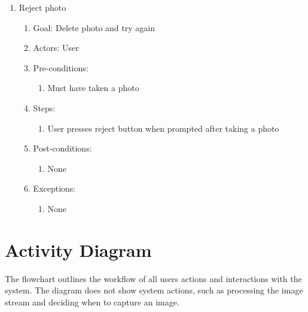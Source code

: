 \documentclass{scu-thesis}
\begin{document}
\begin{enumerate}
    \item Reject photo
    \begin{enumerate}
        \item Goal: Delete photo and try again
        \item Actors: User
        \item Pre-conditions: 
            \begin{enumerate}
                \item Must have taken a photo
            \end{enumerate}
        \item Steps:
            \begin{enumerate}
                \item User presses reject button when prompted after taking a photo
            \end{enumerate}
        \item Post-conditions:
            \begin{enumerate}
                \item None
            \end{enumerate}
        \item Exceptions:
            \begin{enumerate}
                \item None
            \end{enumerate}
    \end{enumerate}
\end{enumerate}


\chapter{Activity Diagram}

The flowchart outlines the workflow of all users actions and interactions with the system. The diagram does not show system actions, such as processing the image stream and deciding when to capture an image.
\end{document}
